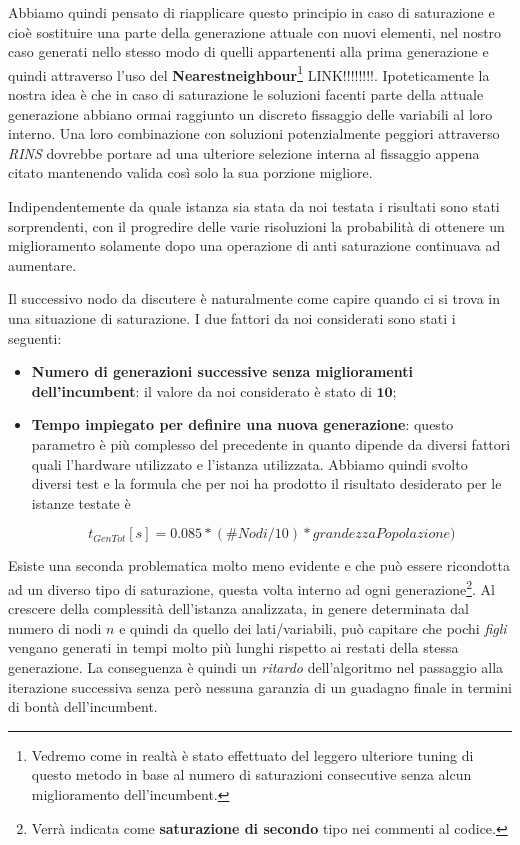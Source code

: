 \documentclass[11pt]{article}
\begin{document}
Abbiamo quindi pensato di riapplicare questo principio in caso di saturazione e cioè sostituire una parte della generazione attuale con nuovi elementi, nel nostro caso generati nello stesso modo di quelli appartenenti alla prima generazione e quindi attraverso l'uso del \textbf{Nearestneighbour}\footnote{Vedremo come in realtà è stato effettuato del leggero ulteriore tuning di questo metodo in base al numero di saturazioni consecutive senza alcun miglioramento dell'incumbent.} LINK!!!!!!!!. Ipoteticamente la nostra idea è che in caso di saturazione le soluzioni facenti parte della attuale generazione abbiano ormai raggiunto un discreto fissaggio delle variabili al loro interno. Una loro combinazione con soluzioni potenzialmente peggiori attraverso \textit{RINS} dovrebbe portare ad una ulteriore selezione interna al fissaggio appena citato mantenendo valida così solo la sua porzione migliore.

Indipendentemente da quale istanza sia stata da noi testata i risultati sono stati sorprendenti, con il progredire delle varie risoluzioni la probabilità di ottenere un miglioramento solamente dopo una operazione di anti saturazione continuava ad aumentare.

Il successivo nodo da discutere è naturalmente come capire quando ci si trova in una situazione di saturazione. I due fattori da noi considerati sono stati i seguenti: 

\begin{itemize}
\item \textbf{Numero di generazioni successive senza miglioramenti dell'incumbent}: il valore da noi considerato è stato di $\textbf{10}$;
\item \textbf{Tempo impiegato per definire una nuova generazione}: questo parametro è più complesso del precedente in quanto dipende da diversi fattori quali l'hardware utilizzato e l'istanza utilizzata. Abbiamo quindi svolto diversi test e la formula che per noi ha prodotto il risultato desiderato per le istanze testate è

\begin{equation}\label{eq:tGen}
\displaystyle t_{GenTot}[s] = 0.085 * (\#Nodi / 10) * grandezzaPopolazione)
\end{equation}
\end{itemize}

Esiste una seconda problematica molto meno evidente e che può essere ricondotta ad un diverso tipo di saturazione, questa volta interno ad ogni generazione\footnote{Verrà indicata come \textbf{saturazione di secondo} tipo nei commenti al codice.}. Al crescere della complessità dell'istanza analizzata, in genere determinata dal numero di nodi $n$ e quindi da quello dei lati/variabili, può capitare che pochi \textit{figli} vengano generati in tempi molto più lunghi rispetto ai restati della stessa generazione. La conseguenza è quindi un \textit{ritardo} dell'algoritmo nel passaggio alla iterazione successiva senza però nessuna garanzia di un guadagno finale in termini di bontà dell'incumbent.
\end{document}
